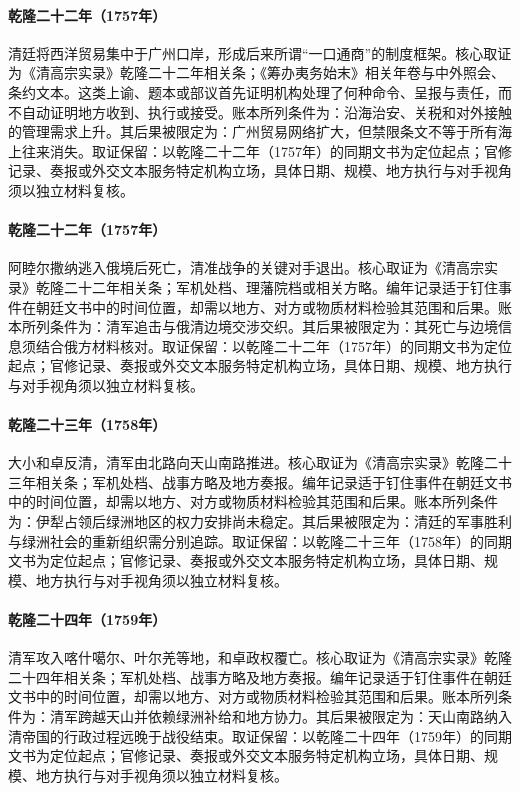 \hypertarget{ledger:EQ-1757-CANTON-TRADE-RESTRICTION}{}\paragraph{乾隆二十二年（1757年）}清廷将西洋贸易集中于广州口岸，形成后来所谓“一口通商”的制度框架。核心取证为《清高宗实录》乾隆二十二年相关条；《筹办夷务始末》相关年卷与中外照会、条约文本。这类上谕、题本或部议首先证明机构处理了何种命令、呈报与责任，而不自动证明地方收到、执行或接受。账本所列条件为：沿海治安、关税和对外接触的管理需求上升。其后果被限定为：广州贸易网络扩大，但禁限条文不等于所有海上往来消失。取证保留：以乾隆二十二年（1757年）的同期文书为定位起点；官修记录、奏报或外交文本服务特定机构立场，具体日期、规模、地方执行与对手视角须以独立材料复核。
\hypertarget{ledger:EQ-1757-AMURSANA-DEATH}{}\paragraph{乾隆二十二年（1757年）}阿睦尔撒纳逃入俄境后死亡，清准战争的关键对手退出。核心取证为《清高宗实录》乾隆二十二年相关条；军机处档、理藩院档或相关方略。编年记录适于钉住事件在朝廷文书中的时间位置，却需以地方、对方或物质材料检验其范围和后果。账本所列条件为：清军追击与俄清边境交涉交织。其后果被限定为：其死亡与边境信息须结合俄方材料核对。取证保留：以乾隆二十二年（1757年）的同期文书为定位起点；官修记录、奏报或外交文本服务特定机构立场，具体日期、规模、地方执行与对手视角须以独立材料复核。
\hypertarget{ledger:EQ-1758-KHOJA-REBELLION}{}\paragraph{乾隆二十三年（1758年）}大小和卓反清，清军由北路向天山南路推进。核心取证为《清高宗实录》乾隆二十三年相关条；军机处档、战事方略及地方奏报。编年记录适于钉住事件在朝廷文书中的时间位置，却需以地方、对方或物质材料检验其范围和后果。账本所列条件为：伊犁占领后绿洲地区的权力安排尚未稳定。其后果被限定为：清廷的军事胜利与绿洲社会的重新组织需分别追踪。取证保留：以乾隆二十三年（1758年）的同期文书为定位起点；官修记录、奏报或外交文本服务特定机构立场，具体日期、规模、地方执行与对手视角须以独立材料复核。
\hypertarget{ledger:EQ-1759-KASHGAR-YARKAND-CAMPAIGN}{}\paragraph{乾隆二十四年（1759年）}清军攻入喀什噶尔、叶尔羌等地，和卓政权覆亡。核心取证为《清高宗实录》乾隆二十四年相关条；军机处档、战事方略及地方奏报。编年记录适于钉住事件在朝廷文书中的时间位置，却需以地方、对方或物质材料检验其范围和后果。账本所列条件为：清军跨越天山并依赖绿洲补给和地方协力。其后果被限定为：天山南路纳入清帝国的行政过程远晚于战役结束。取证保留：以乾隆二十四年（1759年）的同期文书为定位起点；官修记录、奏报或外交文本服务特定机构立场，具体日期、规模、地方执行与对手视角须以独立材料复核。
